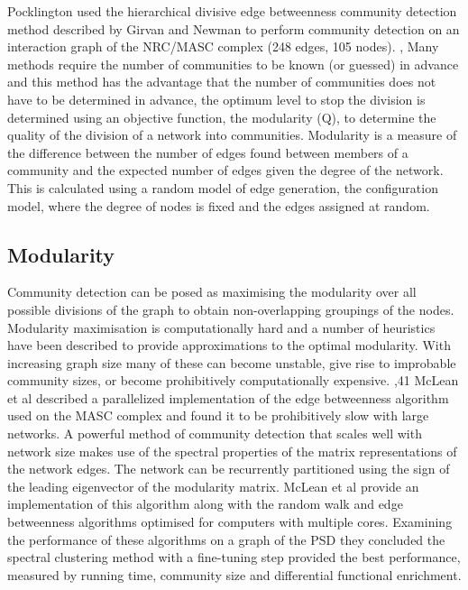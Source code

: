  Pocklington used the hierarchical divisive edge betweenness community detection method described by Girvan and Newman to perform community detection on an interaction graph of the NRC/MASC complex (248 edges, 105 nodes). \cite{pocklington2006proteomes},\cite{girvan2002community} Many methods require the number of communities to be known (or guessed) in advance and this method has the advantage that the number of communities does not have to be determined in advance, the optimum level to stop the division is determined using an objective function, the modularity (Q), to determine the quality of the division of a network into communities. \cite{girvan2002community}  Modularity is a measure of the difference between the number of edges found between members of a community and the expected number of edges given the degree of the network. This is calculated using a random model of edge generation, the configuration model, where the degree of nodes is fixed and the edges assigned at random. \cite{fortunato2016community} 
 
 \subsection{Modularity}

Community detection can be posed as maximising the modularity over all possible divisions of the graph to obtain non-overlapping groupings of the nodes. \cite{newman2013spectral}  Modularity maximisation is computationally hard and a number of heuristics have been described to provide approximations to the optimal modularity. \cite{newman2013spectral} With increasing graph size many of these can become unstable, give rise to improbable community sizes, or become prohibitively computationally expensive. \cite{pocklington2006proteomes},41  
McLean et al \cite{mclean2016improved}  described a parallelized implementation of the edge betweenness algorithm used on the MASC complex   and found it to be prohibitively slow with large networks.  A powerful method of community detection that scales well with network size makes use of the spectral properties of the matrix representations of the network edges. \cite{newman2013spectral}  The network can be recurrently partitioned using the sign of the leading eigenvector of the modularity matrix. \cite{newman2013spectral}  McLean et al \cite{mclean2016improved} provide an implementation of this algorithm along with the random walk and edge betweenness algorithms optimised for computers with multiple cores. Examining the performance of these algorithms on a graph of the PSD they concluded the spectral clustering method with a fine-tuning step provided the best performance, measured by running time, community size and differential functional enrichment. 

